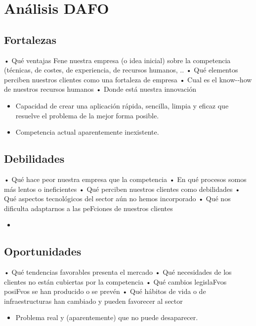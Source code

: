 \section{Análisis DAFO}  

\subsection{Fortalezas}
• Qué ventajas Fene nuestra empresa (o idea inicial) sobre la competencia (técnicas, de costes, de experiencia, de recursos humanos, .. 
• Qué elementos perciben nuestros clientes como una fortaleza de empresa 
• Cual es el know-­‐how de nuestros recursos humanos 
• Donde está nuestra innovación 

\begin{itemize}
    \item Capacidad de crear una aplicación rápida, sencilla, limpia y eficaz que resuelve el problema de la mejor forma posible.
    \item Competencia actual aparentemente inexistente.
\end{itemize}

\subsection{Debilidades}
• Qué hace peor nuestra empresa que la competencia 
• En qué procesos somos más lentos o ineficientes 
• Qué perciben nuestros clientes como debilidades 
• Qué aspectos tecnológicos del sector aún no hemos incorporado 
• Qué nos dificulta adaptarnos a las peFciones de nuestros clientes 

\begin{itemize}
    \item 
\end{itemize}

\subsection{Oportunidades}
• Qué tendencias favorables presenta el mercado 
• Qué necesidades de los clientes no están cubiertas por la competencia 
• Qué cambios legislaFvos posiFvos se han producido o se prevén 
• Qué hábitos de vida o de infraestructuras han cambiado y pueden favorecer al sector 

\begin{itemize}
    \item Problema real y (aparentemente) que no puede desaparecer.
\end{itemize}

